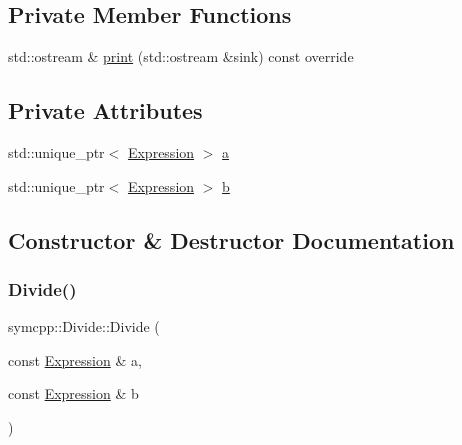 \subsection*{Private Member Functions}
\begin{DoxyCompactItemize}
\item 
std\+::ostream \& \mbox{\hyperlink{classsymcpp_1_1Divide_a113a96148c27f2d50a596c782f9a4005}{print}} (std\+::ostream \&sink) const override
\end{DoxyCompactItemize}
\subsection*{Private Attributes}
\begin{DoxyCompactItemize}
\item 
std\+::unique\+\_\+ptr$<$ \mbox{\hyperlink{classsymcpp_1_1Expression}{Expression}} $>$ \mbox{\hyperlink{classsymcpp_1_1Divide_a52eaf8a705da4ef10b1fa2b87e76d0d8}{a}}
\item 
std\+::unique\+\_\+ptr$<$ \mbox{\hyperlink{classsymcpp_1_1Expression}{Expression}} $>$ \mbox{\hyperlink{classsymcpp_1_1Divide_a122c034c19635c036d39fbf18b1b8348}{b}}
\end{DoxyCompactItemize}


\subsection{Constructor \& Destructor Documentation}
\mbox{\label{classsymcpp_1_1Divide_a1399cc15ca3af6ed217c20cadb2694ad}} 
\subsubsection{\texorpdfstring{Divide()}{Divide()}\hspace{0.1cm}{\footnotesize\ttfamily [1/2]}}
{\footnotesize\ttfamily symcpp\+::\+Divide\+::\+Divide (\begin{DoxyParamCaption}\item[{const \mbox{\hyperlink{classsymcpp_1_1Expression}{Expression}} \&}]{a,  }\item[{const \mbox{\hyperlink{classsymcpp_1_1Expression}{Expression}} \&}]{b }\end{DoxyParamCaption})}

\mbox{\label{classsymcpp_1_1Divide_a010b104132d0341805ca34277422d867}} 
